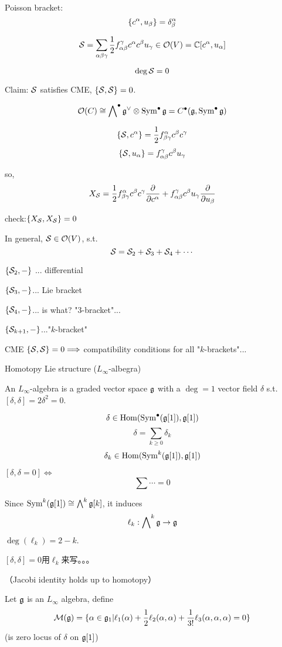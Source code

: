 Poisson bracket:
$$\{c^\alpha,u_\beta\}=\delta^\alpha_\beta$$

$$\mathcal{S}=\sum_{\alpha\beta\gamma}
\frac{1}{2}f_{\alpha\beta}^\gamma c^\alpha c^\beta u_\gamma
\in\mathcal{O}(V)=\mathbb{C}[c^\alpha,u_\alpha]
$$

$$\deg\mathcal{S}=0$$

Claim: $\mathcal{S}$ satisfies CME, $\{\mathcal{S},\mathcal{S}\}=0$.

$$\mathcal{O}(C)\cong \bigwedge\nolimits^{\bullet}\mathfrak{g}^\vee\otimes\operatorname{Sym}^{\bullet}\mathfrak{g}
=C^{\bullet}(\mathfrak{g},\operatorname{Sym}^{\bullet}\mathfrak{g})
$$

$$\{\mathcal{S},c^\alpha\}=\frac{1}{2}f^\alpha_{\beta\gamma}c^\beta c^\gamma$$
$$\{\mathcal{S},u_\alpha\}=f^\gamma_{\alpha\beta}c^\beta u_\gamma$$

so, 
$$X_{\mathcal{S}}=\frac{1}{2}f^\alpha_{\beta\gamma}c^\beta c^\gamma\frac{\partial } {\partial c^\alpha}
+f^\gamma_{\alpha\beta}c^\beta u_\gamma\frac{\partial } {\partial u_\beta}
$$

check:$\{X_{\mathcal{S}},X_{\mathcal{S}}\}=0$
\vs

In general, $\mathcal{S}\in\mathcal{O}(V)$, s.t.
$$\mathcal{S}=\mathcal{S}_2+\mathcal{S}_3+\mathcal{S}_4+\cdots$$

$\{\mathcal{S}_2,-\}$ ... differential

$\{\mathcal{S}_3,-\}$... Lie bracket

$\{\mathcal{S}_4,-\}$... is what? "3-bracket"...

$\{\mathcal{S}_{k+1},-\}$..."$k$-bracket"

CME $\{\mathcal{S},\mathcal{S}\}=0\Longrightarrow$ compatibility conditions for all "$k$-brackets"...

Homotopy Lie structure ($L_\infty$-albegra)

\begin{definition}
An $L_\infty$-algebra is a graded vector space $\mathfrak{g}$ with 
a $\deg=1$ vector field $\delta$ s.t. $[\delta,\delta]=2\delta^2=0$.
\end{definition}
$$\delta\in\operatorname{Hom}(\operatorname{Sym}^{\bullet}(\mathfrak{g}[1]),\mathfrak{g}[1])$$
$$\delta=\sum_{k\geq 0}\delta_k$$
$$\delta_k\in\operatorname{Hom}(\operatorname{Sym}^k(\mathfrak{g}[1]),\mathfrak{g}[1])$$

$[\delta,\delta=0]\iff$
$$\sum\cdots=0$$

Since $\operatorname{Sym}^k(\mathfrak{g}[1])\cong\bigwedge\nolimits^{k}\mathfrak{g}[k]$, it induces 
$$\ell_k:\bigwedge\nolimits^{k}\mathfrak{g}\to\mathfrak{g}$$
$\deg(\ell_k)=2-k$.

$[\delta,\delta]=0$用$\ell_k$来写。。。

（Jacobi identity holds up to homotopy）

Let $\mathfrak{g}$ is an $L_\infty$ algebra, define 
$$\mathcal{M}(\mathfrak{g})=\{\alpha\in\mathfrak{g}_1|
\ell_1(\alpha)+\frac{1}{2}\ell_2(\alpha,\alpha)+\frac{1}{3!}\ell_3(\alpha,\alpha,\alpha)=0
\}$$
(is zero locus of $\delta$ on $\mathfrak{g}[1]$)


